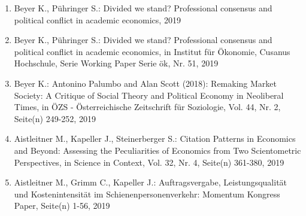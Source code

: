 \begin{enumerate}
	 \item Beyer K., Pühringer S.: Divided we stand? Professional consensus and political conflict in academic economics, 2019
	 \item Beyer K., Pühringer S.: Divided we stand? Professional consensus and political conflict in academic economics, in Institut für Ökonomie, Cusanus Hochschule, Serie Working Paper Serie ök, Nr. 51, 2019
	 \item Beyer K.: Antonino Palumbo and Alan Scott (2018): Remaking Market Society: A Critique of Social Theory and Political Economy in Neoliberal Times, in ÖZS - Österreichische Zeitschrift für Soziologie, Vol. 44, Nr. 2, Seite(n) 249-252, 2019
	 \item Aistleitner M., Kapeller J., Steinerberger S.: Citation Patterns in Economics and Beyond: Assessing the Peculiarities of Economics from Two Scientometric Perspectives, in Science in Context, Vol. 32, Nr. 4, Seite(n) 361-380, 2019
	 \item Aistleitner M., Grimm C., Kapeller J.: Auftragsvergabe, Leistungsqualität und Kostenintensität im Schienenpersonenverkehr: Momentum Kongress Paper, Seite(n) 1-56, 2019
\end{enumerate}

